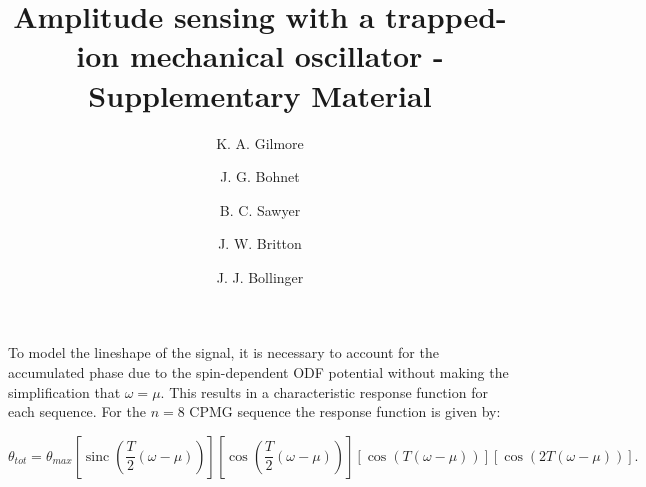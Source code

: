 \documentclass[aps,prl,superscriptaddress,floatfix]{revtex4-1}
\DeclareMathOperator{\sinc}{sinc}
\begin{document}
\title{Amplitude sensing with a trapped-ion mechanical oscillator - Supplementary Material}
\author{K. A. Gilmore}


\author{J. G. Bohnet}

\author{B. C. Sawyer}

\author{J. W. Britton}

\author{J. J. Bollinger}
\maketitle


To model the lineshape of the signal, it is necessary to account for the accumulated phase due to the spin-dependent ODF potential without making the simplification that $ \omega = \mu $. This results in a characteristic response function for each sequence. For the $n = 8$ CPMG sequence the response function is given by:

\begin{widetext}
\begin{equation}
\theta_{tot} = \theta_{max} \left[ \sinc \left( \frac{T}{2} \left( \omega-\mu \right) \right) \right] 
\left[ \cos \left( \frac{T}{2} \left( \omega - \mu \right) \right) \right] \left[ \cos(T(\omega - \mu)) \right] \left[ \cos(2T(\omega - \mu)) \right] .
\end{equation}
\end{widetext}
\end{document}
